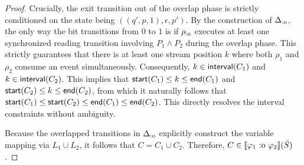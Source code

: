 \begin{proof}
Crucially, the exit transition out of the overlap phase is strictly conditioned on the state being $((q', p, 1), \epsilon, p')$. By the construction of $\Delta_{\text{:o}}$, the only way the bit transitions from $0$ to $1$ is if $\rho_{\text{:o}}$ executes at least one synchronized reading transition involving $P_1 \land P_2$ during the overlap phase. This strictly guarantees that there is at least one stream position $k$ where both $\rho_1$ and $\rho_2$ consume an event simultaneously. 
Consequently, $k \in \mathsf{interval}(C_1)$ and $k \in \mathsf{interval}(C_2)$. This implies that $\mathsf{start}(C_1) \leq k \leq \mathsf{end}(C_1)$ and $\mathsf{start}(C_2) \leq k \leq \mathsf{end}(C_2)$, from which it naturally follows that $\mathsf{start}(C_1) \leq \mathsf{start}(C_2) \leq \mathsf{end}(C_1) \leq \mathsf{end}(C_2)$. This directly resolves the interval constraints without ambiguity.

Because the overlapped transitions in $\Delta_{\text{:o}}$ explicitly construct the variable mapping via $L_1 \cup L_2$, it follows that $C = C_1 \cup C_2$. Therefore, $C \in \sem{\varphi_1 \overlap \varphi_2}(\Stream)$.
\end{proof}

